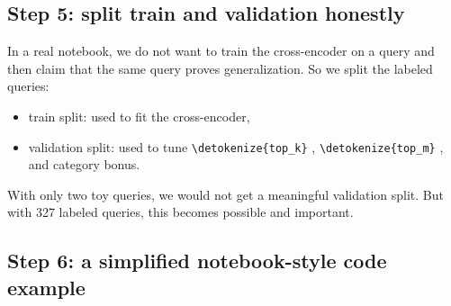 \documentclass[10pt]{article}
\DeclareRobustCommand{\code}[1]{%
  \ifmmode
    \text{\nolinkurl{\detokenize{#1}}}%
  \else
    \nolinkurl{\detokenize{#1}}%
  \fi
}
\begin{document}
\subsection*{Step 5: split train and validation honestly}

In a real notebook, we do not want to train the cross-encoder on a query and then claim that the same query proves generalization. So we split the labeled queries:
\begin{itemize}
    \item train split: used to fit the cross-encoder,
    \item validation split: used to tune \code{top_k}, \code{top_m}, and category bonus.
\end{itemize}

With only two toy queries, we would not get a meaningful validation split. But with 327 labeled queries, this becomes possible and important.

\subsection*{Step 6: a simplified notebook-style code example}
\end{document}
